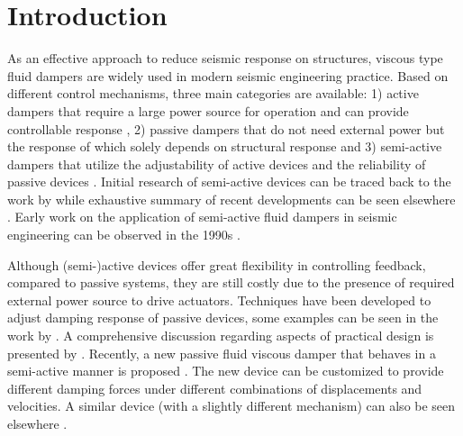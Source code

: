 \section{Introduction}
As an effective approach to reduce seismic response on structures, viscous type fluid dampers are widely used in modern seismic engineering practice. Based on different control mechanisms, three main categories \citep{Symans1997,Saaed2013} are available: 1) active dampers that require a large power source for operation and can provide controllable response \citep{Casciati2012}, 2) passive dampers that do not need external power but the response of which solely depends on structural response and 3) semi-active dampers that utilize the adjustability of active devices and the reliability of passive devices \citep[e.g.,][and the references therein]{Ahmadizadeh2007,Pradono2009,Azimi2017,Wang2019}. Initial research of semi-active devices can be traced back to the work by \citet{Karnopp1974} while exhaustive summary of recent developments can be seen elsewhere \citep{Karnopp1995,Symans1999}. Early work on the application of semi-active fluid dampers in seismic engineering can be observed in the 1990s \citep[see, e.g.,][]{Kawashima1994,Yang1995,Symans1999a}.

Although (semi-)active devices offer great flexibility in controlling feedback, compared to passive systems, they are still costly due to the presence of required external power source to drive actuators. Techniques have been developed to adjust damping response of passive devices, some examples can be seen in the work by \citet{Davis1994}. A comprehensive discussion regarding aspects  of practical design is presented by \citet{Domenico2019}. Recently, a new passive fluid viscous damper that behaves in a semi-active manner is proposed \citep{Hazaveh2017}. The new device can be customized to provide different damping forces under different combinations of displacements and velocities. A similar device (with a slightly different mechanism) can also be seen elsewhere \citep{Zhang2021}.

